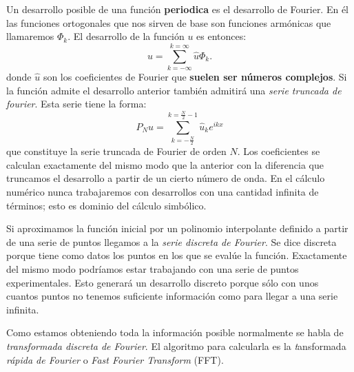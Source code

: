 Un desarrollo posible de una función \textbf{periodica} es el
desarrollo de Fourier. En él las funciones ortogonales que nos sirven
de base son funciones armónicas que llamaremos $\Phi_{k}$. El
desarrollo de la función $u$ es entonces:
$$u=\sum_{k=-\infty}^{k=\infty}\hat{u}\Phi_{k}.$$ donde $\hat{u}$ son
los coeficientes de Fourier que \textbf{suelen ser números complejos}.
Si la función admite el desarrollo anterior también admitirá una
\emph{serie truncada de fourier}. Esta serie tiene la forma:
$$P_{N}u=\sum_{k=-\frac{N}{2}}^{k=\frac{N}{2}-1}\hat{u}_{k}e^{ikx}$$
que constituye la serie truncada de Fourier de orden $N$. Los
coeficientes se calculan exactamente del mismo modo que la anterior
con la diferencia que truncamos el desarrollo a partir de un cierto
número de onda.  En el cálculo numérico nunca trabajaremos con
desarrollos con una cantidad infinita de términos; esto es dominio del
cálculo simbólico.

Si aproximamos la función inicial por un polinomio interpolante
definido a partir de una serie de puntos llegamos a la \emph{serie
  discreta de Fourier}. Se dice discreta porque tiene como datos los
puntos en los que se evalúe la función. Exactamente del mismo modo
podríamos estar trabajando con una serie de puntos experimentales.
Esto generará un desarrollo discreto porque sólo con unos cuantos
puntos no tenemos suficiente información como para llegar a una serie
infinita.

Como estamos obteniendo toda la información posible normalmente se
habla de \emph{transformada discreta de Fourier}. El algoritmo para
calcularla es la \emph{t}ansformada \emph{rápida de Fourier} o
\emph{Fast Fourier Transform} (FFT).

